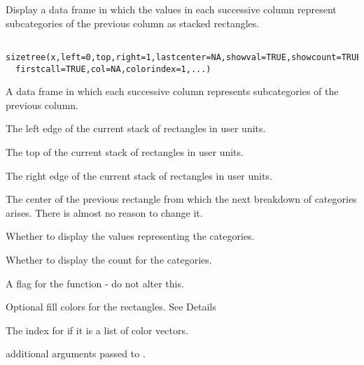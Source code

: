\begin{Description}\relax
Display a data frame in which the values in each successive
column represent subcategories of the previous column as stacked
rectangles.
\end{Description}
\begin{Usage}
\begin{verbatim}
 sizetree(x,left=0,top,right=1,lastcenter=NA,showval=TRUE,showcount=TRUE,
  firstcall=TRUE,col=NA,colorindex=1,...)
\end{verbatim}
\end{Usage}
\begin{Arguments}
\begin{ldescription}
\item[\code{x}] A data frame in which each successive column represents
subcategories of the previous column.
\item[\code{left}] The left edge of the current stack of rectangles in user units.
\item[\code{top}] The top of the current stack of rectangles in user units.
\item[\code{right}] The right edge of the current stack of rectangles in user units.
\item[\code{lastcenter}] The center of the previous rectangle from which the next
breakdown of categories arises. There is almost no reason to change it.
\item[\code{showval}] Whether to display the values representing the categories.
\item[\code{showcount}] Whether to display the count for the categories.
\item[\code{firstcall}] A flag for the function - do not alter this.
\item[\code{col}] Optional fill colors for the rectangles. See Details
\item[\code{colorindex}] The index for  if it is a list of color vectors.
\item[\code{...}] additional arguments passed to .
\end{ldescription}
\end{Arguments}
